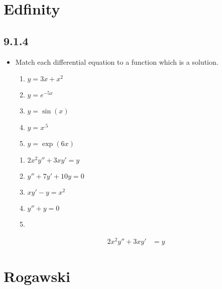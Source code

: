 \documentclass{nosvagor-notes}
\begin{document}
\chapter{Edfinity}

\section{9.1.4}
\begin{itemize}
  \item Match each differential equation to a function which is a solution.
    \begin{multicols}{2}
      \begin{enumerate}[label=\Alph*.]
        \item \( y = 3x + x^2 \)
        \item \( y = e^{-5x} \)
        \item \( y = \sin(x) \)
        \item \( y = x^{.5} \)
        \item \( y = \exp(6x) \)
      \end{enumerate}
      \begin{enumerate}
        \item \( 2x^2y'' + 3xy' = y \)
        \item  \( y'' + 7y' + 10y = 0 \)
        \item \( xy' - y = x^2 \)
        \item \( y'' + y = 0 \)
        \item []
      \end{enumerate}
    \end{multicols}

    \begin{align*}
       2x^2y'' + 3xy' &= y
    \end{align*}

\end{itemize}

\chapter{Rogawski}
\end{document}

